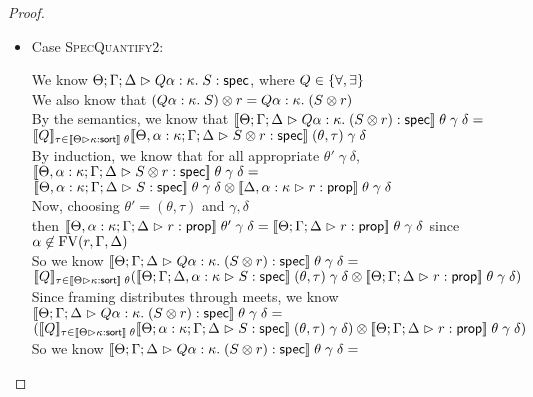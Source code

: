 \begin{proof}
\begin{itemize}
    \item Case \textsc{SpecQuantify2}:
      \begin{tabbedproof}
        \oo We know $\judgeS{Q \alpha:\kappa.\; S}$, where $Q \in \setof{\forall, \exists}$ \\
        \oo We also know that $\Frame{(Q \alpha:\kappa.\; S)}{r} = Q \alpha:\kappa.\; (\Frame{S}{r})$ \\
        \oo By the semantics, we know that $\interp{\judgeS{Q \alpha:\kappa.\; (\Frame{S}{r)}}}\;\theta\;\gamma\;\delta = $ \\
        \oox $\interp{Q}_{\tau \in \interp{\judgeSort{\kappa}}\;\theta} \interp{\judgeS[\Theta, \alpha:\kappa; \Gamma; \Delta]{\Frame{S}{r}}}\;(\theta, \tau)\;\gamma\;\delta$\\
        \oo By induction, we know that for all appropriate $\theta'\;\gamma\;\delta$, 
               $\interp{\judgeS[\Theta, \alpha:\kappa; \Gamma; \Delta]{\Frame{S}{r}}}\;\theta\;\gamma\;\delta = $ \\
        \oox $\Frame{\interp{\judgeS[\Theta, \alpha:\kappa; \Gamma; \Delta]{S}}\;\theta\;\gamma\;\delta}{\interp{\judgeA[\Delta, \alpha:\kappa]{r}{\assert}}\;\theta\;\gamma\;\delta}$ \\
        \oo Now, choosing $\theta' = (\theta, \tau)$ and $\gamma, \delta$ \\
        \oox then $\interp{\judgeA[\Theta, \alpha:\kappa;\Gamma;\Delta]{r}{\assert}}\;\theta'\;\gamma\;\delta = 
                                                   \interp{\judgeA{r}{\assert}}\;\theta\;\gamma\;\delta$ since $\alpha \not\in \FV{r, \Gamma, \Delta}$ \\
        \oo So we know $\interp{\judgeS{Q \alpha:\kappa.\; (\Frame{S}{r)}}}\;\theta\;\gamma\;\delta = $ \\
        \oox $\interp{Q}_{\tau \in \interp{\judgeSort{\kappa}}\;\theta} (\Frame{\interp{\judgeS[\Theta;\Gamma;\Delta, \alpha:\kappa]{S}}\;(\theta, \tau)\;\gamma\;\delta}{\interp{\judgeA{r}{\assert}}\;\theta\;\gamma\;\delta})$ \\
        \oo Since framing distributes through meets, we know $\interp{\judgeS{Q \alpha:\kappa.\; (\Frame{S}{r)}}}\;\theta\;\gamma\;\delta = $ \\
        \oox $\Frame{(\interp{Q}_{\tau \in \interp{\judgeSort{\kappa}}\;\theta} \interp{\judgeS[\Theta; \alpha:\kappa; \Gamma; \Delta]{S}}\;(\theta, \tau)\;\gamma\;\delta)}{\interp{\judgeA{r}{\assert}}\;\theta\;\gamma\;\delta})$ \\
        \oo So we know $\interp{\judgeS{Q \alpha:\kappa.\; (\Frame{S}{r)}}}\;\theta\;\gamma\;\delta = $ \\

\end{tabbedproof}
\end{itemize}
\end{proof}
